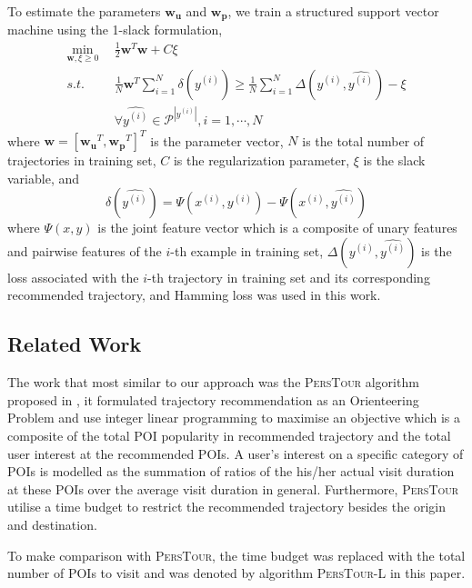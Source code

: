 
To estimate the parameters $\mathbf{w_u}$ and $\mathbf{w_p}$, we train a structured support vector machine
using the 1-slack formulation\cite{ssvm09},
\begin{align*}
    \min_{\mathbf{w}, \xi \ge 0} ~~& \frac{1}{2} \mathbf{w}^T \mathbf{w} + C \xi \\
    s.t. ~~& \frac{1}{N} \mathbf{w}^T \sum_{i=1}^N \delta(\hat{y^{(i)}}) \ge
                  \frac{1}{N} \sum_{i=1}^N \Delta(y^{(i)}, \hat{y^{(i)}}) - \xi \\
         ~~& \forall \hat{y^{(i)}} \in \mathcal{P}^{|y^{(i)}|}, i = 1, \cdots, N
\end{align*}
where $\mathbf{w} = [\mathbf{w_u}^T, \mathbf{w_p}^T]^T$ is the parameter vector,
$N$ is the total number of trajectories in training set, $C$ is the regularization parameter,
$\xi$ is the slack variable, and
\begin{displaymath}
    \delta(\hat{y^{(i)}}) = \Psi(x^{(i)}, y^{(i)}) - \Psi(x^{(i)}, \hat{y^{(i)}})
\end{displaymath}
where $\Psi(x, y)$ is the joint feature vector which is a composite of unary features and pairwise features of the
$i$-th example in training set,
$\Delta(y^{(i)}, \hat{y^{(i)}})$ is the loss associated with the $i$-th trajectory in training set and
its corresponding recommended trajectory, and Hamming loss was used in this work.


\subsection{Related Work}
%


The work that most similar to our approach was the \textsc{PersTour} algorithm proposed in \cite{ijcai15},
it formulated trajectory recommendation as an Orienteering Problem and use integer linear programming to
maximise an objective which is a composite of the total POI popularity in recommended trajectory and
the total user interest at the recommended POIs.
A user's interest on a specific category of POIs is modelled as the summation of ratios of the his/her
actual visit duration at these POIs over the average visit duration in general.
Furthermore, \textsc{PersTour} utilise a time budget to restrict the recommended trajectory besides the
origin and destination.

To make comparison with \textsc{PersTour}, the time budget was replaced with the total number of POIs to visit
and was denoted by algorithm \textsc{PersTour-L} in this paper.
